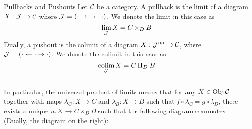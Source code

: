 \documentclass[a4paper]{article}
\begin{document}
\begin{defn}{Pullbacks and Pushouts}{} Let $\mathcal{C}$ be a category. A pullback is the limit of a diagram $X:\mathcal{J}\to\mathcal{C}$ where $\mathcal{J}=\left(\cdot\rightarrow\cdot\leftarrow\cdot\right)$. We denote the limit in this case as $$\lim_{\mathcal{J}} X=C\times_DB$$ Dually, a pushout is the colimit of a diagram $X:\mathcal{J}^{\text{op}}\to\mathcal{C}$, where $\mathcal{J}=\left(\cdot\leftarrow\cdot\rightarrow\cdot\right)$. We denote the colimit in this case as $$\operatorname*{colim}_{\mathcal{J}} X=C\amalg_DB$$~\\

In particular, the universal product of limits means that for any $X\in\operatorname{Obj}\mathcal{C}$ together with maps $\lambda_C:X\to C$ and $\lambda_B:X\to B$ such that $f\circ\lambda_C=g\circ\lambda_D$, there exists a unique $u:X\to C\times_DB$ such that the following diagram commutes (Dually, the diagram on the right): \\~\\
\\~\\
\end{defn}
\end{document}
